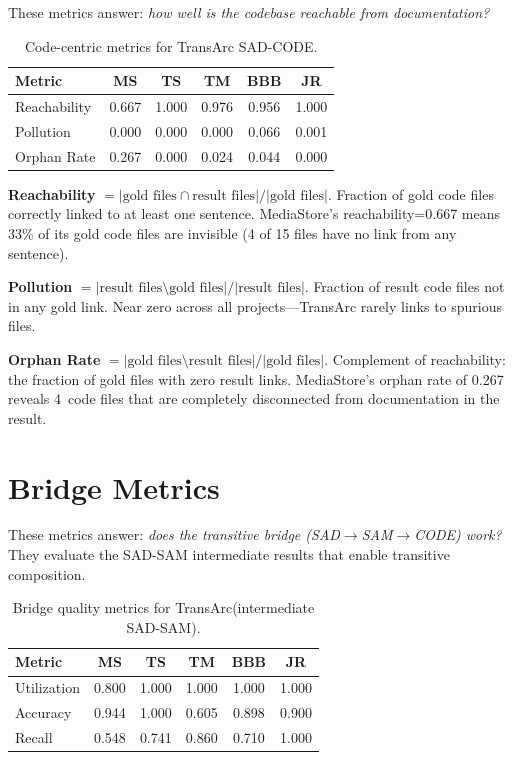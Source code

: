 \documentclass[11pt,a4paper]{report}
\newcommand{\sadcode}{SAD-CODE\xspace}
\newcommand{\sadsam}{SAD-SAM\xspace}
\newcommand{\transarc}{TransArc\xspace}
\begin{document}
These metrics answer: \emph{how well is the codebase reachable from
documentation?}

\begin{table}[h]
\caption{Code-centric metrics for \transarc \sadcode.}
\label{tab:code}
\centering\small
\begin{tabular}{lccccc}
\toprule
\textbf{Metric} & \textbf{MS} & \textbf{TS} & \textbf{TM} & \textbf{BBB} & \textbf{JR} \\
\midrule
Reachability  & 0.667 & 1.000 & 0.976 & 0.956 & 1.000 \\
Pollution     & 0.000 & 0.000 & 0.000 & 0.066 & 0.001 \\
Orphan Rate   & 0.267 & 0.000 & 0.024 & 0.044 & 0.000 \\
\bottomrule
\end{tabular}
\end{table}

\textbf{Reachability} $= |\text{gold files} \cap \text{result files}| /
|\text{gold files}|$. Fraction of gold code files correctly linked to at least
one sentence. MediaStore's reachability=0.667 means 33\% of its gold code files
are invisible (4 of 15 files have no link from any sentence).

\textbf{Pollution} $= |\text{result files} \setminus \text{gold files}| /
|\text{result files}|$. Fraction of result code files not in any gold link.
Near zero across all projects---\transarc rarely links to spurious files.

\textbf{Orphan Rate} $= |\text{gold files} \setminus \text{result files}| /
|\text{gold files}|$. Complement of reachability: the fraction of gold files
with zero result links. MediaStore's orphan rate of 0.267 reveals 4~code files
that are completely disconnected from documentation in the result.


\section{Bridge Metrics}
\label{sec:eval:bridge}

These metrics answer: \emph{does the transitive bridge (SAD$\to$SAM$\to$CODE)
work?} They evaluate the \sadsam intermediate results that enable transitive
composition.

\begin{table}[h]
\caption{Bridge quality metrics for \transarc (intermediate \sadsam).}
\label{tab:bridge}
\centering\small
\begin{tabular}{lccccc}
\toprule
\textbf{Metric} & \textbf{MS} & \textbf{TS} & \textbf{TM} & \textbf{BBB} & \textbf{JR} \\
\midrule
Utilization  & 0.800 & 1.000 & 1.000 & 1.000 & 1.000 \\
Accuracy     & 0.944 & 1.000 & 0.605 & 0.898 & 0.900 \\
Recall       & 0.548 & 0.741 & 0.860 & 0.710 & 1.000 \\
\bottomrule
\end{tabular}
\end{table}
\end{document}
